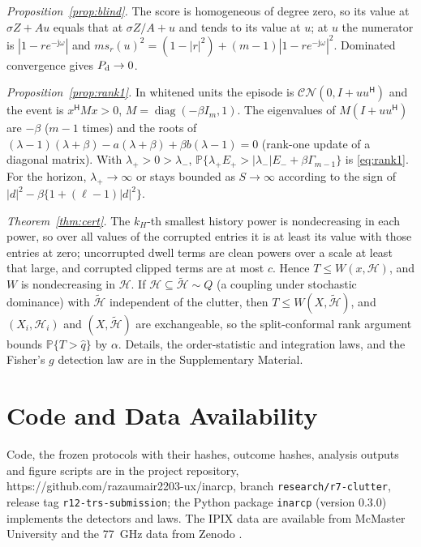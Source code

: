 \documentclass[journal]{IEEEtran}
\newcommand{\PP}{\mathbb{P}}
\begin{document}
\emph{Proposition~\ref{prop:blind}.} The score is homogeneous of degree zero, so its value at $\sigma Z+Au$ equals that at $\sigma Z/A+u$ and tends to its value at $u$; at $u$ the numerator is $|1-re^{-\mathrm j\omega}|$ and $ms_r(u)^2=(1-|r|^2)+(m-1)|1-re^{-\mathrm j\omega}|^2$. Dominated convergence gives $P_{\rm d}\to0$.

\emph{Proposition~\ref{prop:rank1}.} In whitened units the episode is $\mathcal{CN}(0,I+uu^{\mathsf H})$ and the event is $x^{\mathsf H}Mx>0$, $M=\operatorname{diag}(-\beta I_m,1)$. The eigenvalues of $M(I+uu^{\mathsf H})$ are $-\beta$ ($m-1$ times) and the roots of $(\lambda-1)(\lambda+\beta)-a(\lambda+\beta)+\beta b(\lambda-1)=0$ (rank-one update of a diagonal matrix). With $\lambda_+>0>\lambda_-$, $\PP\{\lambda_+E_+>|\lambda_-|E_-+\beta\Gamma_{m-1}\}$ is \eqref{eq:rank1}. For the horizon, $\lambda_+\to\infty$ or stays bounded as $S\to\infty$ according to the sign of $|d|^2-\beta\{1+(\ell-1)|d|^2\}$.

\emph{Theorem~\ref{thm:cert}.} The $k_H$-th smallest history power is nondecreasing in each power, so over all values of the corrupted entries it is at least its value with those entries at zero; uncorrupted dwell terms are clean powers over a scale at least that large, and corrupted clipped terms are at most $c$. Hence $T\le W(x,\mathcal H)$, and $W$ is nondecreasing in $\mathcal H$. If $\mathcal H\subseteq\tilde{\mathcal H}\sim Q$ (a coupling under stochastic dominance) with $\tilde{\mathcal H}$ independent of the clutter, then $T\le W(X,\tilde{\mathcal H})$, and $(X_i,\mathcal H_i)$ and $(X,\tilde{\mathcal H})$ are exchangeable, so the split-conformal rank argument bounds $\PP\{T>\widehat q\}$ by $\alpha$. Details, the order-statistic and integration laws, and the Fisher's $g$ detection law are in the Supplementary Material.

\section*{Code and Data Availability}
Code, the frozen protocols with their hashes, outcome hashes, analysis outputs and figure scripts are in the project repository, https://github.com/razaumair2203-ux/inarcp, branch \texttt{research/r7-clutter}, release tag \texttt{r12-trs-submission}; the Python package \texttt{inarcp} (version 0.3.0) implements the detectors and laws. The IPIX data are available from McMaster University \cite{ipixweb} and the 77~GHz data from Zenodo \cite{jku2026}.
\end{document}
